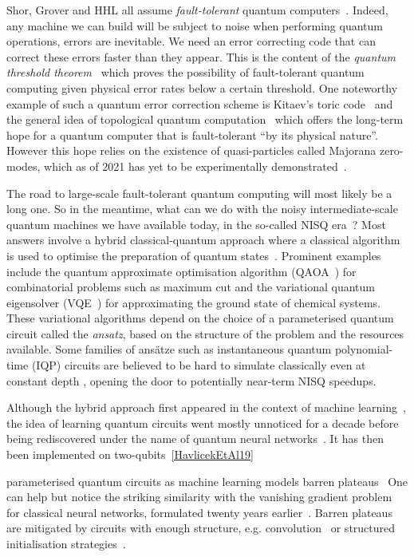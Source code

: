 Shor, Grover and HHL all assume \emph{fault-tolerant}
quantum computers~\cite{Shor96}.
Indeed, any machine we can build will be subject to noise when performing
quantum operations, errors are inevitable.
We need an error correcting code
that can correct these errors faster than they appear.
This is the content of the \emph{quantum threshold theorem}~\cite{AharonovBen-Or08}
which proves the possibility of fault-tolerant quantum computing
given physical error rates below a certain threshold.
One noteworthy example of such a quantum error correction scheme is Kitaev's
toric code~\cite{Kitaev03} and the general idea of topological quantum
computation~\cite{FreedmanEtAl03} which offers the long-term hope for a
quantum computer that is fault-tolerant ``by its physical nature''.
However this hope relies on the existence of quasi-particles called Majorana
zero-modes, which as of 2021 has yet to be experimentally demonstrated~\cite{Ball21}.

The road to large-scale fault-tolerant quantum computing will most likely be a long one.
So in the meantime, what can we do with the noisy intermediate-scale quantum machines we have available today, in the so-called NISQ era~\cite{Preskill18}?
Most answers involve a hybrid classical-quantum approach where a classical algorithm is used to optimise the preparation of quantum states~\cite{McCleanEtAl16}.
Prominent examples include the quantum approximate optimisation algorithm (QAOA~\cite{FarhiEtAl14}) for combinatorial problems such as maximum cut and the variational quantum eigensolver (VQE~\cite{PeruzzoEtAl14}) for approximating the ground state of chemical systems.
These variational algorithms depend on the choice of a parameterised quantum circuit called the \emph{ansatz}, based on the structure of the problem and the resources available.
Some families of ansätze such as instantaneous quantum polynomial-time (IQP) circuits are believed to be hard to simulate classically even at constant depth \cite{ShepherdBremner09}, opening the door to potentially near-term NISQ speedups.

Although the hybrid approach first appeared in the context of machine learning~\cite{BangEtAl08}, the idea of learning quantum circuits went mostly unnoticed for a decade before being rediscovered under the name of quantum neural networks~\cite{FarhiNeven18}.
It has then been implemented on two-qubits~\ref{HavlicekEtAl19}

parameterised quantum circuits as machine learning models \cite{BenedettiEtAl19}
barren plateaus~\cite{McCleanEtAl18}
One can help but notice the striking similarity with the vanishing gradient
problem for classical neural networks, formulated twenty years earlier~\cite{Hochreiter98}.
Barren plateaus are mitigated by circuits with enough structure, e.g. convolution~\cite{PesahEtAl21} or structured initialisation strategies~\cite{GrantEtAl19}.

